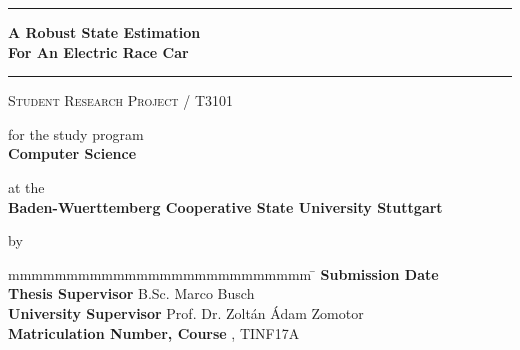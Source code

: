 \hfill
{}

\vfill
\begin{center}
	\rule{\textwidth}{1pt}
	{
		\Huge
		\bfseries
		A Robust State Estimation \\ For An Electric Race Car
		\par
	}
	\vspace{-0.2cm} 
	\rule{\textwidth}{1pt}

	\vfill

	\textsc{Student Research Project / T3101}
	
	\vfill

	for the study program \\ \textbf{Computer Science}
	
	at the \\ \textbf{Baden-Wuerttemberg Cooperative State University Stuttgart}
	
	by \\ \textbf{\@author}
\end{center}

\vfill

\begin{tabbing}
	mmmmmmmmmmmmmmmmmmmmmmmmmm				\= \kill
	\textbf{Submission Date}				\> \@date \\
	\textbf{Thesis Supervisor}           	\> B.Sc. Marco Busch \\
	\textbf{University Supervisor}          \> Prof. Dr. Zoltán Ádam Zomotor \\
	\textbf{Matriculation Number, Course}  	, TINF17A
\end{tabbing}
